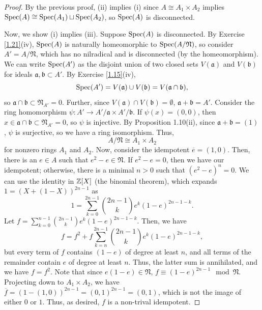 \begin{proof}
By the previous proof, (ii) implies (i) since $A \cong A_1 \times A_2$ implies $\operatorname{Spec}(A) \cong \operatorname{Spec}(A_1) \sqcup \operatorname{Spec}(A_2)$, so $\operatorname{Spec}(A)$ is disconnected. 

Now, we show (i) implies (iii). Suppose $\operatorname{Spec}(A)$ is disconnected. By Exercise \ref{1.21}(iv), $\operatorname{Spec}(A)$ is naturally homeomorphic to $\operatorname{Spec}(A/\mathfrak{N})$, 
so consider $A' = A/\mathfrak{N}$, which has no nilradical and is disconnected (by the homeomorphism). We can write $\operatorname{Spec}(A')$ as the disjoint union 
of two closed sets $V(\mathfrak{a})$ and $V(\mathfrak{b})$  for ideals $\mathfrak{a},\mathfrak{b} \subset A'$. By Exercise \ref{1.15}(iv),
$$\operatorname{Spec}(A') = V(\mathfrak{a}) \cup V(\mathfrak{b}) = V(\mathfrak{a} \cap \mathfrak{b}),$$
so $\mathfrak{a} \cap \mathfrak{b} \subset \mathfrak{N}_{A'} = 0$. Further, since $V(\mathfrak{a}) \cap V(\mathfrak{b}) = \emptyset$, $\mathfrak{a} + \mathfrak{b} = A'$.
Consider the ring homomorphism $\psi: A' \to A'/\mathfrak{a} \times A'/\mathfrak{b}$. If
$\psi(x) = (0,0)$, then $x \in \mathfrak{a} \cap \mathfrak{b} \subset \mathfrak{N}_{A'} = 0$, so $\psi$ is injective. By Proposition 1.10(ii), since
$\mathfrak{a} + \mathfrak{b} = (1)$, $\psi$ is surjective, so we have a ring isomorphism. Thus, 
$$A / \mathfrak{N} \cong A_1 \times A_2$$ for nonzero rings $A_1$ and $A_2$. Now, consider the idempotent $\overline{e} = (1,0)$. Then, there is an $e \in A$ such 
that $e^2 - e \in \mathfrak{N}$. If $e^2 - e = 0$, then we have our idempotent; otherwise, there is a minimal $n > 0$ such that
$(e^2 - e)^n = 0$. We can use the identity in $\mathbb{Z}[X]$ (the binomial theorem), which expands $1 = (X + (1-X))^{2n-1}$ as
$$1 = \sum_{k=0}^{2n-1}\binom{2n-1}{k}e^k (1-e)^{2n-1-k}.$$
Let $f = \sum_{k=0}^{n-1}\binom{2n-1}{k}e^k(1-e)^{2n-1-k}$. Then, we have
$$f = f^2 + f\sum_{k=n}^{2n-1}\binom{2n-1}{k}e^k(1-e)^{2n-1-k},$$
but every term of $f$ contains $(1-e)$ of degree at least $n$, and all terms of the remainder contain $e$ of degree at least $n$. Thus, the latter sum is annihilated,
and we have $f = f^2$. Note that since $e(1-e) \in \mathfrak{N}$, $f \equiv (1-e)^{2n-1} \mod \mathfrak{N}$. Projecting down to $A_1 \times A_2$, we have
$\overline{f} = (1 - (1,0))^{2n-1} = (0,1)^{2n-1} = (0,1)$, which is not the image of either $0$ or $1$. Thus, as desired, $f$ is a non-trival idempotent.


\end{proof}
